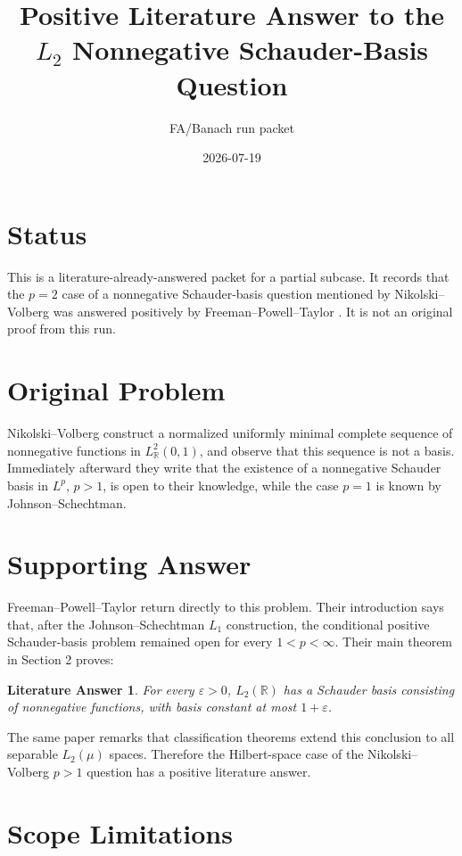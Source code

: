 \documentclass[11pt]{article}
\title{Positive Literature Answer to the \(L_2\) Nonnegative Schauder-Basis Question}
\author{FA/Banach run packet}
\date{2026-07-19}
\newtheorem*{theorem}{Literature Answer}
\begin{document}
\maketitle

\section*{Status}

This is a literature-already-answered packet for a partial subcase.  It records
that the \(p=2\) case of a nonnegative Schauder-basis question mentioned by
Nikolski--Volberg \cite{NV} was answered positively by Freeman--Powell--Taylor
\cite{FPT}.  It is not an original proof from this run.

\section*{Original Problem}

Nikolski--Volberg \cite{NV} construct a normalized uniformly minimal complete
sequence of nonnegative functions in \(L^2_{\mathbb R}(0,1)\), and observe that
this sequence is not a basis.  Immediately afterward they write that the
existence of a nonnegative Schauder basis in \(L^p\), \(p>1\), is open to their
knowledge, while the case \(p=1\) is known by Johnson--Schechtman.

\section*{Supporting Answer}

Freeman--Powell--Taylor \cite{FPT} return directly to this problem.  Their
introduction says that, after the Johnson--Schechtman \(L_1\) construction, the
conditional positive Schauder-basis problem remained open for every
\(1<p<\infty\).  Their main theorem in Section 2 proves:

\begin{theorem}
For every \(\varepsilon>0\), \(L_2(\mathbb R)\) has a Schauder basis consisting
of nonnegative functions, with basis constant at most \(1+\varepsilon\).
\end{theorem}

The same paper remarks that classification theorems extend this conclusion to
all separable \(L_2(\mu)\) spaces.  Therefore the Hilbert-space case of the
Nikolski--Volberg \(p>1\) question has a positive literature answer.

\section*{Scope Limitations}
\end{document}
